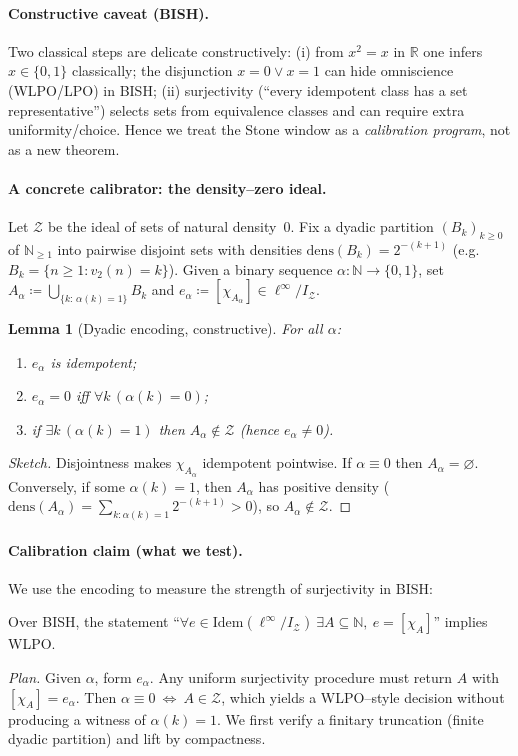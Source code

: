\documentclass[11pt]{article}
\newtheorem{lemma}[theorem]{Lemma}
\theoremstyle{definition}
\theoremstyle{remark}
\begin{document}
\paragraph{Constructive caveat (BISH).}
Two classical steps are delicate constructively:
(i) from $x^2=x$ in $\mathbb R$ one infers $x\in\{0,1\}$ classically; the disjunction $x=0\vee x=1$
can hide omniscience (WLPO/LPO) in BISH;
(ii) surjectivity (``every idempotent class has a set representative'') selects sets from equivalence classes and can require extra uniformity/choice.
Hence we treat the Stone window as a \emph{calibration program}, not as a new theorem.

\paragraph{A concrete calibrator: the density--zero ideal.}
Let $\mathcal Z$ be the ideal of sets of natural density~$0$.
Fix a dyadic partition $(B_k)_{k\ge 0}$ of $\mathbb N_{\ge 1}$ into pairwise disjoint sets with densities
$\mathrm{dens}(B_k)=2^{-(k+1)}$ (e.g.\ $B_k=\{n\ge1: v_2(n)=k\}$).
Given a binary sequence $\alpha:\mathbb N\to\{0,1\}$, set
$A_\alpha \coloneqq \bigcup_{\{k:\,\alpha(k)=1\}} B_k$ and $e_\alpha\coloneqq [\chi_{A_\alpha}]\in \ell^\infty/I_{\mathcal Z}$.

\begin{lemma}[Dyadic encoding, constructive]
For all $\alpha$:
\begin{enumerate}
\item $e_\alpha$ is idempotent;
\item $e_\alpha=0$ iff $\forall k\,(\alpha(k)=0)$;
\item if $\exists k\,(\alpha(k)=1)$ then $A_\alpha\notin \mathcal Z$ (hence $e_\alpha\neq 0$).
\end{enumerate}
\end{lemma}
\begin{proof}[Sketch]
Disjointness makes $\chi_{A_\alpha}$ idempotent pointwise.
If $\alpha\equiv 0$ then $A_\alpha=\varnothing$.
Conversely, if some $\alpha(k)=1$, then $A_\alpha$ has positive density
($\mathrm{dens}(A_\alpha)=\sum_{k:\alpha(k)=1}2^{-(k+1)}>0$),
so $A_\alpha\notin\mathcal Z$.
\end{proof}

\paragraph{Calibration claim (what we test).}
We use the encoding to measure the strength of surjectivity in BISH:
\begin{conjecture}
\label{conj:surj-density-zero-WLPO}
Over BISH, the statement
``$\forall e\in \mathrm{Idem}(\ell^\infty/I_{\mathcal Z})\ \exists A\subseteq\mathbb N,\ e=[\chi_A]$''
implies WLPO.
\end{conjecture}
\emph{Plan.} Given $\alpha$, form $e_\alpha$.
Any uniform surjectivity procedure must return $A$ with $[\chi_A]=e_\alpha$.
Then $\alpha\equiv 0\ \Leftrightarrow\ A\in\mathcal Z$,
which yields a WLPO--style decision without producing a witness of $\alpha(k)=1$.
We first verify a finitary truncation (finite dyadic partition) and lift by compactness.
\end{document}
